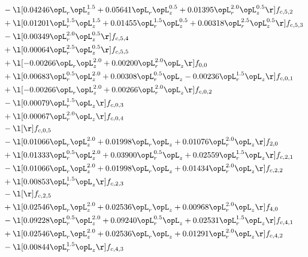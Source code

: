 \begin{alignat}{2}
& - \l[  0.04246 \opL_r \opL_z^{1.5} +  0.05641 \opL_r \opL_z^{0.5} +  0.01395 \opL_r^{2.0} \opL_z^{0.5}  \r] f_{c,5,2} \nonumber \\ 
& + \l[  0.01201 \opL_r^{1.5} \opL_z^{1.5} +  0.01455 \opL_r^{1.5} \opL_z^{0.5} +  0.00318 \opL_r^{2.5} \opL_z^{0.5}  \r] f_{c,5,3} \nonumber \\ 
& - \l[  0.00349 \opL_r^{2.0} \opL_z^{0.5}  \r] f_{c,5,4} \nonumber \\ 
& + \l[  0.00064 \opL_r^{2.5} \opL_z^{0.5}  \r] f_{c,5,5} \nonumber \\ 
& + \l[  -0.00266 \opL_r \opL_z^{2.0} +  0.00200 \opL_r^{2.0} \opL_z  \r] f_{0,0} \nonumber \\ 
& + \l[  0.00683 \opL_r^{0.5} \opL_z^{2.0} +  0.00308 \opL_r^{0.5} \opL_z   -0.00236 \opL_r^{1.5} \opL_z  \r] f_{c,0,1} \nonumber \\ 
& + \l[  -0.00266 \opL_r \opL_z^{2.0} +  0.00266 \opL_r^{2.0} \opL_z  \r] f_{c,0,2} \nonumber \\ 
& - \l[  0.00079 \opL_r^{1.5} \opL_z  \r] f_{c,0,3} \nonumber \\ 
& + \l[  0.00067 \opL_r^{2.0} \opL_z  \r] f_{c,0,4} \nonumber \\ 
& - \l[  \r] f_{c,0,5} \nonumber \\ 
& - \l[  0.01066 \opL_r \opL_z^{2.0} +  0.01998 \opL_r \opL_z +  0.01076 \opL_r^{2.0} \opL_z  \r] f_{2,0} \nonumber \\ 
& + \l[  0.01333 \opL_r^{0.5} \opL_z^{2.0} +  0.03900 \opL_r^{0.5} \opL_z +  0.02559 \opL_r^{1.5} \opL_z  \r] f_{c,2,1} \nonumber \\ 
& - \l[  0.01066 \opL_r \opL_z^{2.0} +  0.01998 \opL_r \opL_z +  0.01434 \opL_r^{2.0} \opL_z  \r] f_{c,2,2} \nonumber \\ 
& + \l[  0.00853 \opL_r^{1.5} \opL_z  \r] f_{c,2,3} \nonumber \\ 
& - \l[  \r] f_{c,2,5} \nonumber \\ 
& + \l[  0.02546 \opL_r \opL_z^{2.0} +  0.02536 \opL_r \opL_z +  0.00968 \opL_r^{2.0} \opL_z  \r] f_{4,0} \nonumber \\ 
& - \l[  0.09228 \opL_r^{0.5} \opL_z^{2.0} +  0.09240 \opL_r^{0.5} \opL_z +  0.02531 \opL_r^{1.5} \opL_z  \r] f_{c,4,1} \nonumber \\ 
& + \l[  0.02546 \opL_r \opL_z^{2.0} +  0.02536 \opL_r \opL_z +  0.01291 \opL_r^{2.0} \opL_z  \r] f_{c,4,2} \nonumber \\ 
& - \l[  0.00844 \opL_r^{1.5} \opL_z  \r] f_{c,4,3} \nonumber \\ 

\end{alignat}
